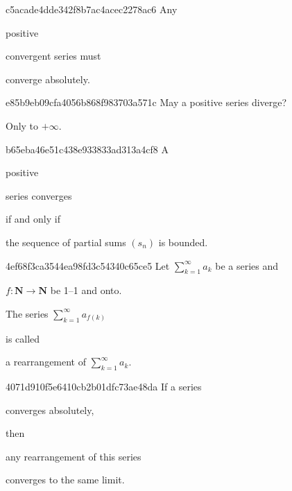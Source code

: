\begin{note}{c5acade4dde342f8b7ac4acec2278ac6}
    Any \begin{icloze}{2}positive\end{icloze} convergent series must \begin{icloze}{1}converge absolutely.\end{icloze}
\end{note}

\begin{note}{e85b9eb09cfa4056b868f983703a571c}
    May a positive series diverge?

    \begin{cloze}{1}
        Only to \({ +\infty }\).
    \end{cloze}
\end{note}

\begin{note}{b65eba46e51c438e933833ad313a4cf8}
    A \begin{icloze}{2}positive\end{icloze} series converges \begin{icloze}{3}if and only if\end{icloze} \begin{icloze}{1}the sequence of partial sums \({ (s_n) }\) is bounded.\end{icloze}
\end{note}

\begin{note}{4ef68f3ca3544ea98fd3c54340c65ce5}
    Let \({ \sum_{k=1}^{\infty} a_k }\) be a series and \begin{icloze}{3}\({ f : \mathbf{N} \to \mathbf{N} }\) be 1--1 and onto.\end{icloze}
    \begin{icloze}{2}The series \({ \sum_{k=1}^{\infty} a_{f(k)} }\)\end{icloze} is called \begin{icloze}{1}a rearrangement of \({ \sum_{k=1}^{\infty} a_k }\).\end{icloze}
\end{note}

\begin{note}{4071d910f5e6410cb2b01dfc73ae48da}
    If a series \begin{icloze}{2}converges absolutely,\end{icloze} then \begin{icloze}{3}any rearrangement of this series\end{icloze} \begin{icloze}{1}converges to the same limit.\end{icloze}
\end{note}

